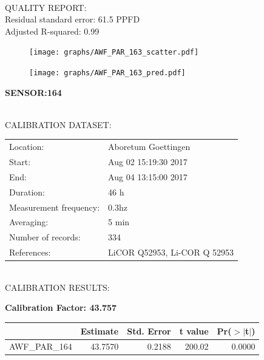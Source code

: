 \documentclass[oneside]{report}
\begin{document}
\hrulefill\\
QUALITY REPORT:\\
Residual standard error: 61.5 PPFD\\
Adjusted R-squared: 0.99



\begin{figure}[H]
  \centering
  \texttt{[image: graphs/AWF\_PAR\_163\_scatter.pdf]}
\end{figure}




\begin{figure}[H]
  \centering
  \texttt{[image: graphs/AWF\_PAR\_163\_pred.pdf]}
\end{figure}

\pagebreak


\begin{center}
\large{\textbf{SENSOR:164}}\\
\end{center}

\hrulefill\\
CALIBRATION DATASET:\\
\begin{table}[h!]
  \centering
  \label{tab:table1}
  \begin{tabular}{ll}
    Location: & Aboretum Goettingen\\ 
    
    
    Start:  & Aug 02 15:19:30 2017 \\
    End:   & Aug 04 13:15:00 2017\\ 
    Duration: & 46 h\\
    Measurement frequency: & 0.3hz\\
    Averaging:  &5 min\\
    Number of records: & 334 \\
    References: & LiCOR Q52953, Li-COR Q 52953 \\
  \end{tabular}
\end{table}

\hrulefill\\
CALIBRATION RESULTS:\\


\begin{center}
\textbf{\large{Calibration Factor: 43.757}}\\
\end{center}
\begin{table}[ht]
\centering
\begin{tabular}{rrrrr}
  \hline
 & Estimate & Std. Error & t value & Pr($>$$|$t$|$) \\ 
  \hline
AWF\_PAR\_164 & 43.7570 & 0.2188 & 200.02 & 0.0000 \\ 
   \hline
\end{tabular}
\end{table}
\end{document}
